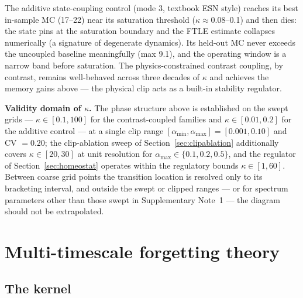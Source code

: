 \documentclass[11pt]{article}
\begin{document}
The additive state-coupling control (mode 3, textbook ESN style) reaches its
best in-sample MC (17--22) near its saturation threshold
($\kappa\approx 0.08$--0.1) and then dies: the state pins at the saturation
boundary and the FTLE estimate collapses numerically (a signature of degenerate
dynamics). Its held-out MC never exceeds the uncoupled baseline meaningfully
(max 9.1), and the operating window is a narrow band before saturation. The
physics-constrained contrast coupling, by contrast, remains well-behaved across
three decades of $\kappa$ and achieves the memory gains above --- the physical
clip acts as a built-in stability regulator.

\textbf{Validity domain of $\kappa$.} The phase structure above is
established on the swept grids --- $\kappa\in[0.1,100]$ for the
contrast-coupled families and $\kappa\in[0.01,0.2]$ for the additive control
--- at a single clip range $[\alpha_{\min},\alpha_{\max}]=[0.001,0.10]$ and
CV $=0.20$; the clip-ablation sweep of Section~\ref{sec:clipablation}
additionally covers $\kappa\in[20,30]$ at unit resolution for
$\alpha_{\max}\in\{0.1,0.2,0.5\}$, and the regulator of
Section~\ref{sec:homeostat} operates within the regulatory bounds
$\kappa\in[1,60]$. Between coarse grid points the transition location is
resolved only to its bracketing interval, and outside the swept or clipped
ranges --- or for spectrum parameters other than those swept in
Supplementary Note~1 --- the diagram should not be extrapolated.

\section{Multi-timescale forgetting theory}
\label{sec:kernel}

\subsection{The kernel}
\end{document}
